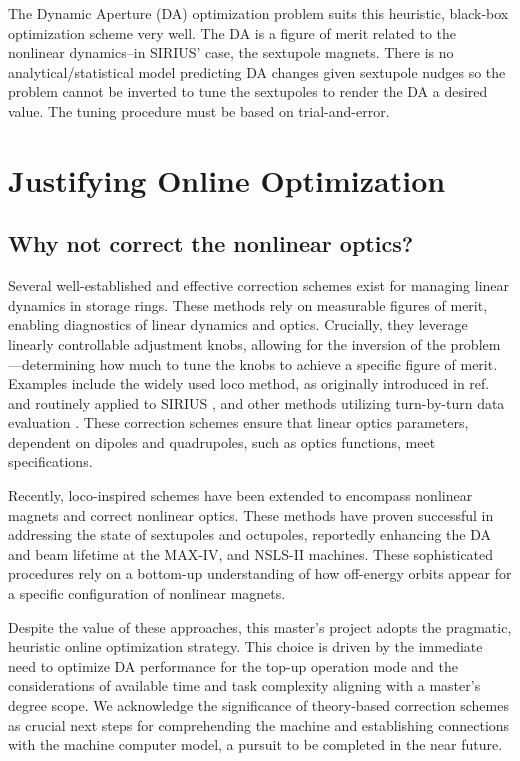 The Dynamic Aperture (\gls*{DA}) optimization problem suits this heuristic, black-box optimization scheme very well. The \gls*{DA} is a figure of merit related to the nonlinear dynamics--in SIRIUS' case, the sextupole magnets. There is no analytical/statistical model predicting \gls*{DA} changes given sextupole nudges so the problem cannot be inverted to tune the sextupoles to render the \gls*{DA} a desired value. The tuning procedure must be based on trial-and-error.

\section{Justifying Online Optimization}
\subsection{Why not correct the nonlinear optics?}
Several well-established and effective correction schemes exist for managing linear dynamics in storage rings. These methods rely on measurable figures of merit, enabling diagnostics of linear dynamics and optics. Crucially, they leverage linearly controllable adjustment knobs, allowing for the inversion of the problem—determining how much to tune the knobs to achieve a specific figure of merit. Examples include the widely used \gls*{loco} method, as originally introduced in ref.\cite{safranek_experimental_1997} and routinely applied to SIRIUS \cite{alves_linear_2021, alves_optics_2021}, and other methods utilizing turn-by-turn data evaluation \cite[chapter 5]{huang_beam-based_2019}. These correction schemes ensure that linear optics parameters, dependent on dipoles and quadrupoles, such as optics functions, meet specifications.

Recently, \gls*{loco}-inspired schemes have been extended to encompass nonlinear magnets and correct nonlinear optics. These methods have proven successful in addressing the state of sextupoles and octupoles, reportedly enhancing the \gls*{DA} and beam lifetime at the MAX-IV, \cite{olsson_nonlinear_2020} and NSLS-II \cite{li_nonlinear_2024} machines. These sophisticated procedures rely on a bottom-up understanding of how off-energy orbits appear for a specific configuration of nonlinear magnets.

Despite the value of these approaches, this master's project adopts the pragmatic, heuristic online optimization strategy. This choice is driven by the immediate need to optimize \gls*{DA} performance for the top-up operation mode and the considerations of available time and task complexity aligning with a master's degree scope. We acknowledge the significance of theory-based correction schemes as crucial next steps for comprehending the machine and establishing connections with the machine computer model, a pursuit to be completed in the near future.

